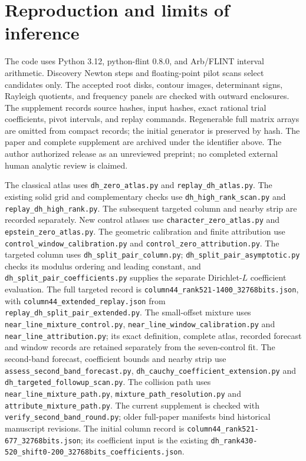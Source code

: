 \documentclass[11pt]{article}
\theoremstyle{remark}
\newcommand{\code}[1]{\nolinkurl{#1}}
\begin{document}
\section{Reproduction and limits of inference}
The code uses Python 3.12, python-flint 0.8.0, and Arb/FLINT interval
arithmetic. Discovery Newton steps and floating-point pilot scans select
candidates only. The accepted root disks, contour images, determinant signs,
Rayleigh quotients, and frequency panels are checked with outward
enclosures. The supplement records source hashes, input hashes, exact
rational trial coefficients, pivot intervals, and replay commands.
Regenerable full matrix arrays are omitted from compact records; the initial
generator is preserved by hash. The paper and complete supplement are
archived under the identifier above. The author authorized release as an
unreviewed preprint; no completed external human analytic review is claimed.

The classical atlas uses \code{dh_zero_atlas.py} and
\code{replay_dh_atlas.py}. The existing solid grid and complementary checks
use \code{dh_high_rank_scan.py} and \code{replay_dh_high_rank.py}. The
subsequent targeted column and nearby strip are recorded separately. New control atlases use
\code{character_zero_atlas.py} and \code{epstein_zero_atlas.py}.
The geometric calibration and finite attribution use
\code{control_window_calibration.py} and \code{control_zero_attribution.py}.
The targeted column uses \code{dh_split_pair_column.py};
\code{dh_split_pair_asymptotic.py} checks its modulus ordering and leading
constant, and \code{dh_split_pair_coefficients.py} supplies the separate
Dirichlet-\(L\) coefficient evaluation. The full targeted record is
\code{column44_rank521-1400_32768bits.json}, with
\code{column44_extended_replay.json} from
\code{replay_dh_split_pair_extended.py}.
The small-offset mixture uses \code{near_line_mixture_control.py},
\code{near_line_window_calibration.py} and \code{near_line_attribution.py};
its exact definition, complete atlas, recorded forecast and window records
are retained separately from the seven-control fit.
The second-band forecast, coefficient bounds and nearby strip use
\code{assess_second_band_forecast.py},
\code{dh_cauchy_coefficient_extension.py} and
\code{dh_targeted_followup_scan.py}. The collision path uses
\code{near_line_mixture_path.py}, \code{mixture_path_resolution.py} and
\code{attribute_mixture_path.py}. The current supplement is checked with
\code{verify_second_band_round.py}; older full-paper manifests bind
historical manuscript revisions.
The initial column record is
\code{column44_rank521-677_32768bits.json}; its coefficient input is the
existing \code{dh_rank430-520_shift0-200_32768bits_coefficients.json}.
\end{document}
